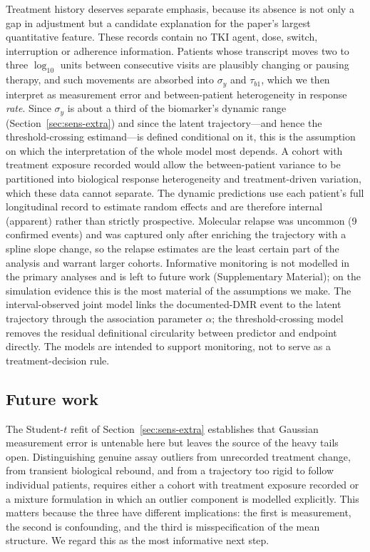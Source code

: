 \documentclass[11pt]{article}
\begin{document}
Treatment history deserves separate emphasis, because its absence is not only a
gap in adjustment but a candidate explanation for the paper's largest
quantitative feature. These records contain no TKI agent, dose, switch,
interruption or adherence information. Patients whose transcript moves two to
three $\log_{10}$ units between consecutive visits are plausibly changing or
pausing therapy, and such movements are absorbed into $\sigma_y$ and
$\tau_{b1}$, which we then interpret as measurement error and between-patient
heterogeneity in response \emph{rate}. Since $\sigma_y$ is about a third of the
biomarker's dynamic range (Section~\ref{sec:sens-extra}) and since the latent
trajectory---and hence the threshold-crossing estimand---is defined conditional
on it, this is the assumption on which the interpretation of the whole model
most depends. A cohort with treatment exposure recorded would allow the
between-patient variance to be partitioned into biological response
heterogeneity and treatment-driven variation, which these data cannot separate. The dynamic predictions
use each patient's full longitudinal record to estimate random effects and
are therefore internal (apparent) rather than strictly prospective. Molecular
relapse was uncommon (9 confirmed events) and was captured only after enriching
the trajectory with a spline slope change, so the relapse estimates are the
least certain part of the analysis and warrant larger cohorts. Informative
monitoring is not modelled in the primary analyses and is left to future work
(Supplementary Material); on the simulation evidence this is the most material
of the assumptions we make. The interval-observed joint model links the
documented-DMR event to the latent trajectory through the association parameter
$\alpha$; the threshold-crossing model removes the residual definitional
circularity between predictor and endpoint directly. The models are intended to
support monitoring, not to serve as a treatment-decision rule.

\subsection{Future work}
\label{sec:future}

The Student-$t$ refit of Section~\ref{sec:sens-extra} establishes that Gaussian
measurement error is untenable here but leaves the source of the heavy tails
open. Distinguishing genuine assay outliers from unrecorded treatment change,
from transient biological rebound, and from a trajectory too rigid to follow
individual patients, requires either a cohort with treatment exposure recorded
or a mixture formulation in which an outlier component is modelled explicitly.
This matters because the three have different implications: the first is
measurement, the second is confounding, and the third is misspecification of the
mean structure. We regard this as the most informative next step.
\end{document}
